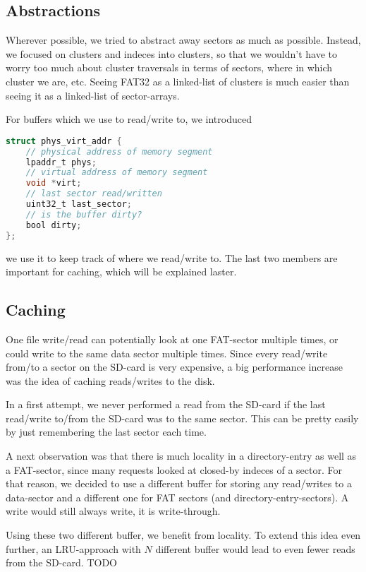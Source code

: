 \subsection{Abstractions}
Wherever possible, we tried to abstract away sectors as much as possible.
Instead, we focused on clusters and indeces into clusters, so that 
we wouldn't have to worry too much about cluster traversals in terms of 
sectors, where in which cluster we are, etc. Seeing FAT32 as a linked-list 
of clusters is much easier than seeing it as a linked-list of sector-arrays.

For buffers which we use to read/write to, we introduced 
\begin{lstlisting}[language=C]
struct phys_virt_addr {
    // physical address of memory segment
    lpaddr_t phys;
    // virtual address of memory segment
    void *virt;
    // last sector read/written
    uint32_t last_sector;
    // is the buffer dirty?
    bool dirty;
};
\end{lstlisting}
we use it to keep track of where we read/write to. The last two members 
are important for caching, which will be explained laster.




\subsection{Caching}
One file write/read can potentially look at one FAT-sector multiple times,
or could write to the same data sector multiple times. Since every 
read/write from/to a sector on the SD-card is very expensive, a big 
performance increase was the idea of caching reads/writes to the disk.

In a first attempt, we never performed a read from the SD-card if 
the last read/write to/from the SD-card was to the same sector. This can 
be pretty easily by just remembering the last sector each time.

A next observation was that there is much locality in a directory-entry 
as well as a FAT-sector, since many requests looked at closed-by indeces
of a sector. For that reason, we decided to use a different buffer 
for storing any read/writes to a data-sector and a different one for 
FAT sectors (and directory-entry-sectors). 
A write would still always write, it is write-through.

Using these two different buffer, we benefit from locality.
To extend this idea even further, an LRU-approach with $N$ different 
buffer would lead to even fewer reads from the SD-card.
TODO


